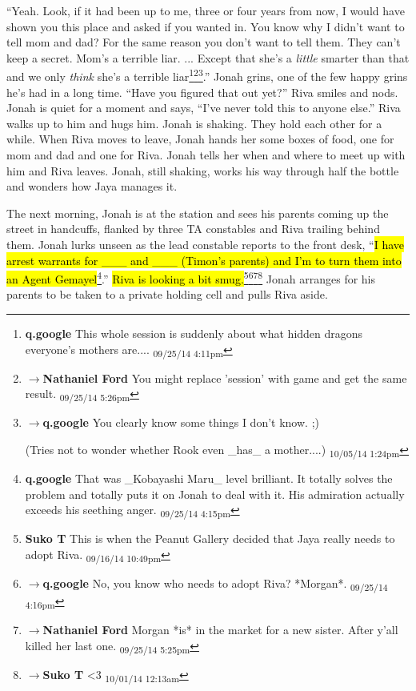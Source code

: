 ``Yeah.  Look, if it had been up to me, three or four years from now, I would have shown you this place and asked if you wanted in.  You know why I didn't want to tell mom and dad?  For the same reason you don't want to tell them.  They can't keep a secret.  Mom's a terrible liar. ... Except that she's a \textit{little} smarter than that and we only \textit{think} she's a terrible liar\footnote{\textbf{q.google }This whole session is suddenly about what hidden dragons everyone's mothers are.... \textsubscript{09/25/14 4:11pm}}\footnote{$\rightarrow$\textbf{Nathaniel Ford }You might replace 'session' with game and get the same result. \textsubscript{09/25/14 5:26pm}}\footnote{$\rightarrow$\textbf{q.google }You clearly know some things I don't know. ;)

(Tries not to wonder whether Rook even \_has\_ a mother....) \textsubscript{10/05/14 1:24pm}}.''  Jonah grins, one of the few happy grins he's had in a long time.  ``Have you figured that out yet?''  Riva smiles and nods.  Jonah is quiet for a moment and says, ``I've never told this to anyone else.'' Riva walks up to him and hugs him.  Jonah is shaking.  They hold each other for a while.  When Riva moves to leave, Jonah hands her some boxes of food, one for mom and dad and one for Riva.  Jonah tells her when and where to meet up with him and Riva leaves.  Jonah, still shaking, works his way through half the bottle and wonders how Jaya manages it.



The next morning, Jonah is at the station and sees his parents coming up the street in handcuffs, flanked by three TA constables and Riva trailing behind them.  Jonah lurks unseen as the lead constable reports to the front desk, ``\hl{I have arrest warrants for \_\_\_ and \_\_\_ (Timon's parents) and I'm to turn them into an Agent Gemayel}\footnote{\textbf{q.google }That was \_Kobayashi Maru\_ level brilliant.  It totally solves the problem and totally puts it on Jonah to deal with it.  His admiration actually exceeds his seething anger. \textsubscript{09/25/14 4:15pm}}.''  \hl{Riva is looking a bit smug.}\footnote{\textbf{Suko T }This is when the Peanut Gallery decided that Jaya really needs to adopt Riva. \textsubscript{09/16/14 10:49pm}}\footnote{$\rightarrow$\textbf{q.google }No, you know who needs to adopt Riva?  *Morgan*. \textsubscript{09/25/14 4:16pm}}\footnote{$\rightarrow$\textbf{Nathaniel Ford }Morgan *is* in the market for a new sister. After y'all killed her last one. \textsubscript{09/25/14 5:25pm}}\footnote{$\rightarrow$\textbf{Suko T }\textless 3 \textsubscript{10/01/14 12:13am}}  Jonah arranges for his parents to be taken to a private holding cell and pulls Riva aside.

